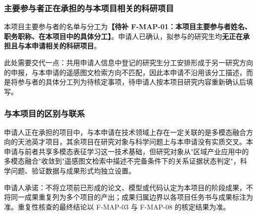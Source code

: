 \subsubsection{主要参与者正在承担的与本项目相关的科研项目}

本项目主要参与者的名单与分工为\textbf{【待补 F-MAP-01：本项目主要参与者姓名、职务职称、在本项目中的具体分工】}。申请人已确认，拟参与的研究生均\textbf{无正在承担且与本申请相关的科研项目}。

此处需要交代一点：共用申请人信息中登记的研究生分工安排形成于另一研究方向的申报，与本申请的遥感图文检索方向不匹配，因此本申请不沿用该分工描述，而是将参与者的具体分工列为待核定事项，待申请人按本项目研究内容重新确认后填写。

\subsubsection{与本项目的区别与联系}

申请人正在承担的项目中，与本申请在技术领域上存在一定关联的是多模态融合方向的天池英才项目，其余项目在研究对象与科学问题上与本申请没有实质交叉。本申请与前者共享多模态表征学习这一技术基础，但研究对象从"区域产业应用中的多模态融合"收敛到"遥感图文检索中描述不完备条件下的关系证据状态判定"，科学问题、验证数据与成果形式均独立设置。

申请人承诺：不将立项前已形成的论文、模型或代码认定为本项目的阶段成果，不将同一成果重复列为多个项目的产出；成果归属边界以各项目任务书与成果标注为准。重复性核查的最终结论以 F-MAP-03 与 F-MAP-08 的核定结果为准。
